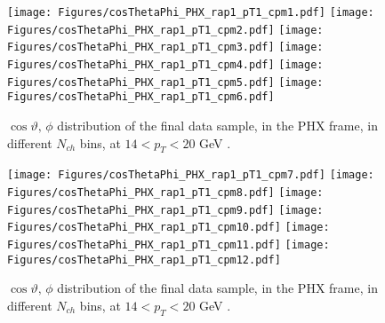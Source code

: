 \documentclass[12pt]{article}
\newcommand{\pt}{$p_{\mathrm{T}}$}
\begin{document}
%
%

\begin{figure}[htbp]
\centering
\texttt{[image: Figures/cosThetaPhi\_PHX\_rap1\_pT1\_cpm1.pdf]}
\texttt{[image: Figures/cosThetaPhi\_PHX\_rap1\_pT1\_cpm2.pdf]}
\texttt{[image: Figures/cosThetaPhi\_PHX\_rap1\_pT1\_cpm3.pdf]}
\texttt{[image: Figures/cosThetaPhi\_PHX\_rap1\_pT1\_cpm4.pdf]}
\texttt{[image: Figures/cosThetaPhi\_PHX\_rap1\_pT1\_cpm5.pdf]}
\texttt{[image: Figures/cosThetaPhi\_PHX\_rap1\_pT1\_cpm6.pdf]}
\caption{$\cos\vartheta,\,\phi$ distribution of the final data sample, 
	in the PHX frame, in different $N_{ch}$ bins, at $14 < p_{T} < 20$ GeV .}
\end{figure}
\clearpage

\begin{figure}[htbp]
\centering
\texttt{[image: Figures/cosThetaPhi\_PHX\_rap1\_pT1\_cpm7.pdf]}
\texttt{[image: Figures/cosThetaPhi\_PHX\_rap1\_pT1\_cpm8.pdf]}
\texttt{[image: Figures/cosThetaPhi\_PHX\_rap1\_pT1\_cpm9.pdf]}
\texttt{[image: Figures/cosThetaPhi\_PHX\_rap1\_pT1\_cpm10.pdf]}
\texttt{[image: Figures/cosThetaPhi\_PHX\_rap1\_pT1\_cpm11.pdf]}
\texttt{[image: Figures/cosThetaPhi\_PHX\_rap1\_pT1\_cpm12.pdf]}
\caption{$\cos\vartheta,\,\phi$ distribution of the final data sample, 
	in the PHX frame, in different $N_{ch}$ bins, at $14 < p_{T} < 20$ GeV .}
\end{figure}
\clearpage
\end{document}
